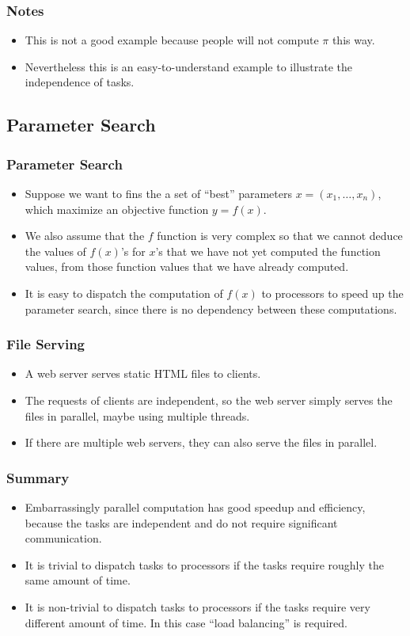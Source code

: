 \documentclass{beamer}
\begin{document}
\begin{CJK}{UTF8}{bsmi}
\begin{frame}
\frametitle{Notes}
\begin{itemize}
\item This is not a good example because people will not compute $\pi$
  this way.
\item Nevertheless this is an easy-to-understand example to illustrate
  the independence of tasks.
\end{itemize}
\end{frame}

\subsection{Parameter Search}

\begin{frame}
\frametitle{Parameter Search}
\begin{itemize}
\item Suppose we want to fins the a set of ``best'' parameters $x =
  (x_1, \ldots, x_n)$, which maximize an objective function $y =
  f(x)$.
\item We also assume that the $f$ function is very complex so that we
  cannot deduce the values of $f(x)$'s for $x$'s that we have not yet
  computed the function values, from those function values that we
  have already computed.
\item It is easy to dispatch the computation of $f(x)$ to processors to
  speed up the parameter search, since there is no dependency between
  these computations.
\end{itemize}
\end{frame}

\begin{frame}
\frametitle{File Serving}
\begin{itemize}
\item A web server serves static HTML files to clients.
\item The requests of clients are independent, so the web server
  simply serves the files in parallel, maybe using multiple threads.
\item If there are multiple web servers, they can also serve the files
  in parallel.
\end{itemize}
\end{frame}

\begin{frame}
\frametitle{Summary}
\begin{itemize}
\item Embarrassingly parallel computation has good speedup and
  efficiency, because the tasks are independent and do not require
  significant communication.
\item It is trivial to dispatch tasks to processors if the tasks
  require roughly the same amount of time.
\item It is non-trivial to dispatch tasks to processors if the tasks
  require very different amount of time.  In this case ``load
  balancing'' is required.
\end{itemize}
\end{frame}



\end{CJK}
\end{document}
